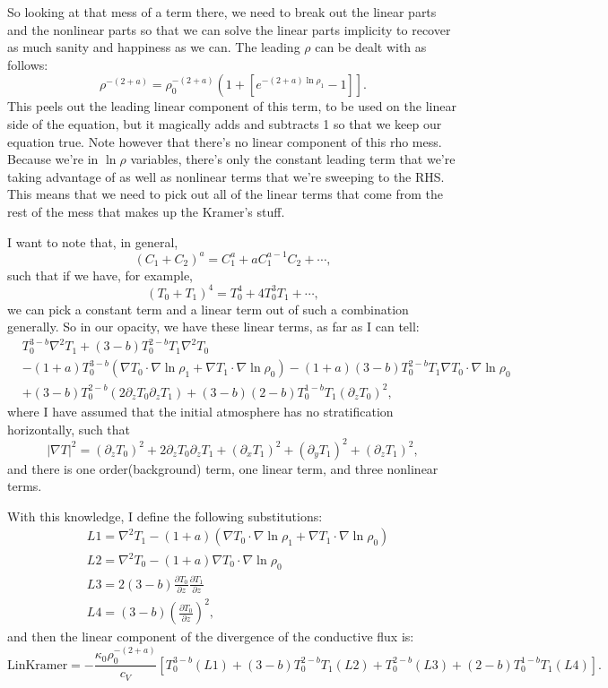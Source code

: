 \documentclass[aps, pre, onecolumn, nofootinbib, notitlepage, groupedaddress, amsfonts, amssymb, amsmath, longbibliography]{revtex4-1}
\newcommand{\grad}{\ensuremath{\nabla}}
\begin{document}
So looking at that mess of a term there, we need to break out the linear parts
and the nonlinear parts so that we can solve the linear parts implicity to recover
as much sanity and happiness as we can. The leading $\rho$ can be dealt with as
follows:
$$
\rho^{-(2+a)} = \rho_0^{-(2+a)}\left(1 + \left[e^{-(2+a)\ln\rho_1} - 1\right]\right].
$$
This peels out the leading linear component of this term, to be used on the linear
side of the equation, but it magically adds and subtracts 1 so that we keep our
equation true. Note however that there's no linear component of this rho mess.
Because we're in $\ln\rho$ variables, there's only the constant leading term
that we're taking advantage of as well as nonlinear terms that we're sweeping to
the RHS. This means that we need to pick out all of the linear terms that come
from the rest of the mess that makes up the Kramer's stuff.

I want to note that, in general,
$$
(C_1 + C_2)^a = C_1^a + a C_1^{a-1}C_2 + \cdots,
$$
such that if we have, for example,
$$
(T_0 + T_1)^4 = T_0^4 + 4 T_0^3 T_1 + \cdots,
$$
we can pick a constant term and a linear term out of such a combination generally.
So in our opacity, we have these linear terms, as far as I can tell:
\begin{align*}
&T_0^{3-b}\grad^2 T_1 + (3-b)T_0^{2-b}T_1 \grad^2 T_0 \\
&- (1 + a)T_0^{3-b}( \grad T_0 \cdot \grad \ln \rho_1 + \grad T_1 \cdot \grad\ln\rho_0) - (1 + a)(3-b)T_0^{2-b}T_1 \grad T_0 \cdot\grad\ln\rho_0 \\
&+ (3 - b) T_0^{2-b}(2 \partial_z T_0 \partial_z T_1) + (3-b)(2-b)T_0^{1-b}T_1 (\partial_z T_0)^2,
\end{align*}
where I have assumed that the initial atmosphere has no stratification
horizontally, such that
$$
|\grad T|^2 = (\partial_z T_0)^2 + 2 \partial_z T_0 \partial_z T_1 +
(\partial_x T_1)^2 + (\partial_y T_1)^2 + (\partial_z T_1)^2,
$$
and there is one order(background) term, one linear term, and three nonlinear terms.


With this knowledge, I define the following substitutions:
\begin{align*}
& L1 = \grad^2 T_1 - (1 + a)(\grad T_0\cdot\grad\ln\rho_1 + \grad T_1\cdot\grad\ln\rho_0) \\
& L2 = \grad^2 T_0 - (1 + a)\grad T_0\cdot\grad\ln\rho_0 \\
& L3 = 2(3-b)\frac{\partial T_0}{\partial z}\frac{\partial T_1}{\partial z} \\
& L4 = (3-b) \left(\frac{\partial T_0}{\partial z}\right)^2,
\end{align*}
and then the linear component of the divergence of the conductive flux is:
\begin{equation}
\boxed{
\text{LinKramer} = -\frac{\kappa_0 \rho_0^{-(2+a)}}{c_V}\left[
T_0^{3-b}(L1) + (3-b)T_0^{2-b}T_1(L2) + T_0^{2-b}(L3) + (2-b)T_0^{1-b}T_1(L4)
\right]
}.
\end{equation}
\end{document}
